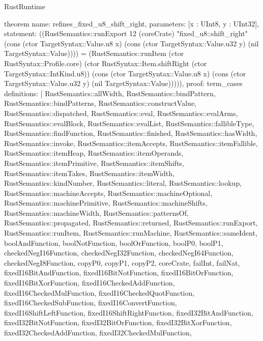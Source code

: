 \begin{lexlean}{RustRuntime}
\begin{semanticmodule}
theorem{
  name: refines_fixed_u8_shift_right,
  parameters: [x : UInt8, y : UInt32],
  statement: ((RustSemantics::runExport 12 (coreCrate) "fixed_u8::shift_right" (cons (ctor TargetSyntax::Value.u8 x) (cons (ctor TargetSyntax::Value.u32 y) (nil TargetSyntax::Value)))) = (RustSemantics::runItem (ctor RustSyntax::Profile.core) (ctor RustSyntax::Item.shiftRight (ctor TargetSyntax::IntKind.u8)) (cons (ctor TargetSyntax::Value.u8 x) (cons (ctor TargetSyntax::Value.u32 y) (nil TargetSyntax::Value))))),
  proof: term_cases{
    definitions: [
      RustSemantics::allWidth,
      RustSemantics::bindPattern,
      RustSemantics::bindPatterns,
      RustSemantics::constructValue,
      RustSemantics::dispatched,
      RustSemantics::eval,
      RustSemantics::evalArms,
      RustSemantics::evalBlock,
      RustSemantics::evalList,
      RustSemantics::fallibleType,
      RustSemantics::findFunction,
      RustSemantics::finished,
      RustSemantics::hasWidth,
      RustSemantics::invoke,
      RustSemantics::itemAccepts,
      RustSemantics::itemFallible,
      RustSemantics::itemHeap,
      RustSemantics::itemOperands,
      RustSemantics::itemPrimitive,
      RustSemantics::itemShifts,
      RustSemantics::itemTakes,
      RustSemantics::itemWidth,
      RustSemantics::kindNumber,
      RustSemantics::literal,
      RustSemantics::lookup,
      RustSemantics::machineAccepts,
      RustSemantics::machineOptional,
      RustSemantics::machinePrimitive,
      RustSemantics::machineShifts,
      RustSemantics::machineWidth,
      RustSemantics::patternsOf,
      RustSemantics::propagated,
      RustSemantics::returned,
      RustSemantics::runExport,
      RustSemantics::runItem,
      RustSemantics::runMachine,
      RustSemantics::sameIdent,
      boolAndFunction,
      boolNotFunction,
      boolOrFunction,
      boolP0,
      boolP1,
      checkedNegI16Function,
      checkedNegI32Function,
      checkedNegI64Function,
      checkedNegI8Function,
      copyP0,
      copyP1,
      copyP2,
      coreCrate,
      failInt,
      failNat,
      fixedI16BitAndFunction,
      fixedI16BitNotFunction,
      fixedI16BitOrFunction,
      fixedI16BitXorFunction,
      fixedI16CheckedAddFunction,
      fixedI16CheckedMulFunction,
      fixedI16CheckedQuotFunction,
      fixedI16CheckedSubFunction,
      fixedI16ConvertFunction,
      fixedI16ShiftLeftFunction,
      fixedI16ShiftRightFunction,
      fixedI32BitAndFunction,
      fixedI32BitNotFunction,
      fixedI32BitOrFunction,
      fixedI32BitXorFunction,
      fixedI32CheckedAddFunction,
      fixedI32CheckedMulFunction,
}}
\end{semanticmodule}
\end{lexlean}
